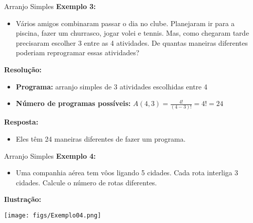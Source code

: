 \documentclass[aspectratio=169]{beamer}
\begin{document}
\begin{frame}{Arranjo Simples}
    \textbf{Exemplo 3:}
    \vspace{4mm}

    \begin{itemize}
        \item[] Vários amigos combinaram passar o dia no clube. Planejaram ir para a piscina, fazer um churrasco, jogar volei e tennis. Mas, como chegaram tarde precisaram escolher 3 entre as 4 atividades. De quantas maneiras diferentes poderiam reprogramar essas atividades?
    \end{itemize}

    \vspace{2mm}
    \pause
    \textbf{Resolução:}
    \begin{itemize}
        \item[] \textbf{Programa:} arranjo simples de 3 atividades escolhidas entre 4 \pause
        \item[] \textbf{Número de programas possíveis:} $ A (4,3) = \frac{4!}{(4-3)!} = 4! = 24$
    \end{itemize}

    \pause
    \vspace{2mm}
    \textbf{Resposta:}

    \begin{itemize}
        \item[] Eles têm 24 maneiras diferentes de fazer um programa.
    \end{itemize}
\end{frame}

\begin{frame}{Arranjo Simples}
    \textbf{Exemplo 4:}
    \vspace{2mm}

    \begin{itemize}
        \item[] Uma companhia aérea tem vôos ligando 5 cidades. Cada rota interliga 3 cidades. Calcule o número de rotas diferentes.
    \end{itemize}

    \vspace{2mm}
    \pause
    \textbf{Ilustração:}
    
    \begin{center}
        \texttt{[image: figs/Exemplo04.png]}
    \end{center}
\end{frame}
\end{document}
